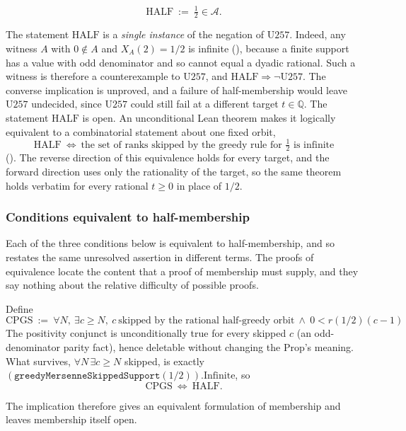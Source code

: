 \begin{defn}
\[
\mathrm{HALF}\ :=\ \tfrac12\in\mathcal{A}.
\]
\end{defn}
The statement $\mathrm{HALF}$ is a \emph{single instance} of the negation of $\mathrm{U257}$. Indeed, any witness
$A$ with $0\notin A$ and $X_{A}(2)=1/2$ is infinite
(),
because a finite support has a value with odd denominator and so cannot equal a dyadic rational. Such a
witness is therefore a counterexample to $\mathrm{U257}$, and $\mathrm{HALF}\Rightarrow\neg\mathrm{U257}$.  The converse
implication is unproved, and a failure of half-membership would leave $\mathrm{U257}$ undecided,
since $\mathrm{U257}$ could still fail at a different target $t\in\mathbb{Q}$.  The statement $\mathrm{HALF}$ is open.  An
unconditional Lean theorem makes it logically equivalent to a combinatorial statement about one fixed orbit,
\[
\mathrm{HALF}\ \Longleftrightarrow\ \text{the set of ranks skipped by the greedy rule for }\tfrac12\text{ is infinite}
\]
().
The reverse direction of this equivalence holds for every target, and the forward direction uses only
the rationality of the target, so the same theorem holds verbatim for every rational $t\ge 0$ in place of $1/2$.

\subsubsection{Conditions equivalent to half-membership}

Each of the three conditions below is equivalent to half-membership,
and so restates the same unresolved assertion in different terms.  The
proofs of equivalence locate the content that a proof of membership must
supply, and they say nothing about the relative difficulty of possible proofs.

\begin{prop}
\label{prop:cpgs-equiv}
Define
\[
\mathrm{CPGS}\ :=\ \forall N,\ \exists c\ge N,\ c\ \text{skipped by the rational half-greedy
orbit}\ \wedge\ 0<\ensuremath{r}(1/2)(c-1)
\]
The positivity
conjunct is unconditionally true for every skipped $c$
(an odd-denominator parity fact), hence deletable without changing
the Prop's meaning. What survives, $\forall N\,\exists c\ge N$ skipped, is exactly
$(\mathtt{greedyMersenneSkippedSupport}(1/2)).\mathrm{Infinite}$, so
\[
\mathrm{CPGS}\ \Longleftrightarrow\ \mathrm{HALF}.
\]
\end{prop}
The implication
therefore gives an equivalent formulation of membership and leaves membership itself open.


